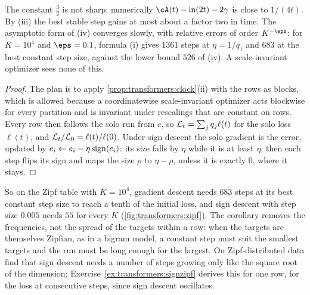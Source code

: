 \begin{refsection}
The constant $\frac32$ is not sharp: numerically $\cA(t)-\ln(2t)-2\gamma$ is close to $1/(4t)$. By (iii) the best stable step gains at most about a factor two in time. The asymptotic form of (iv) converges slowly, with relative errors of order $K^{-\eps}$: for $K=10^4$ and $\eps=0.1$, formula (i) gives $1361$ steps at $\eta=1/q_1$ and $683$ at the best constant step size, against the lower bound $526$ of (iv). A scale-invariant optimizer sees none of this.


\begin{proof}
The plan is to apply \cref{prop:transformers:clock}(ii) with the rows as blocks, which is allowed because a coordinatewise scale-invariant optimizer acts blockwise for every partition and is invariant under rescalings that are constant on rows. Every row then follows the solo run from $e$, so $\mathcal{L}_t=\sum_jq_j\ell(t)$ for the solo loss $\ell(t)$, and $\mathcal{L}_t/\mathcal{L}_0=\ell(t)/\ell(0)$. Under sign descent the solo gradient is the error, updated by $e_i\leftarrow e_i-\eta\operatorname{sign}(e_i)$: its size falls by $\eta$ while it is at least $\eta$; then each step flips its sign and maps the size $\rho$ to $\eta-\rho$, unless it is exactly $0$, where it stays.
\end{proof}

So on the Zipf table with $K=10^4$, gradient descent needs $683$ steps at its best constant step size to reach a tenth of the initial loss, and sign descent with step size $0.005$ needs $55$ for every $K$ (\cref{fig:transformers:zipf}). The corollary removes the frequencies, not the spread of the targets within a row: when the targets are themselves Zipfian, as in a bigram model, a constant step must suit the smallest targets and the run must be long enough for the largest. On Zipf-distributed data \textcite{KunstnerBach2025} find that sign descent needs a number of steps growing only like the square root of the dimension; Exercise~\ref{ex:transformers:signzipf} derives this for one row, for the loss at consecutive steps, since sign descent oscillates.


\end{refsection}
